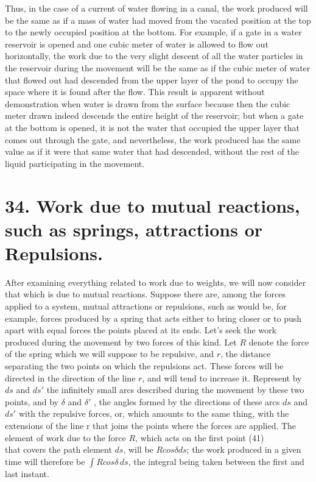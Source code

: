 \documentclass{book}
\begin{document}
Thus, in the case of a current of water flowing in a canal, the work produced will be the same as if a mass of water had moved from the vacated position at the top to the newly occupied position at the bottom. For example, if a gate in a water reservoir is opened and one cubic meter of water is allowed to flow out horizontally, the work due to the very slight descent of all the water particles in the reservoir during the movement will be the same as if the cubic meter of water that flowed out had descended from the upper layer of the pond to occupy the space where it is found after the flow. This result is apparent without demonstration when water is drawn from the surface because then the cubic meter drawn indeed descends the entire height of the reservoir; but when a gate at the bottom is opened, it is not the water that occupied the upper layer that comes out through the gate, and nevertheless, the work produced has the same value as if it were that same water that had descended, without the rest of the liquid participating in the movement.
\section{34. Work due to mutual reactions, such as springs, attractions or
Repulsions.}
After examining everything related to work due to weights, we will now consider that which is due to mutual reactions.
Suppose there are, among the forces applied to a system, mutual attractions or repulsions, such as would be, for example, forces produced by a spring that acts either to bring closer or to push apart with equal forces the points placed at its ends. Let's seek the work produced during the movement by two forces of this kind.
Let \(R\) denote the force of the spring which we will suppose to be repulsive, and \(r\), the distance separating the two points on which the repulsions act. These forces will be directed in the direction of the line \(r\), and will tend to increase it. Represent by \(ds\) and \(ds'\) the infinitely small arcs described during the movement by these two points, and by \(\delta\) and \(\delta'\) , the angles formed by the directions of these arcs \(ds\) and \(ds'\) with the repulsive forces, or, which amounts to the same thing, with the extensions of the line r that joins the points where the forces are applied.
The element of work due to the force \(R\), which acts on the first point
\newpage
(41)\\
that covers the path element \(ds\), will be \(Rcos \delta ds\); the work produced in a given time will therefore be \( \int Rcos \delta\,ds\), the integral being taken between the first and last instant.
\end{document}
